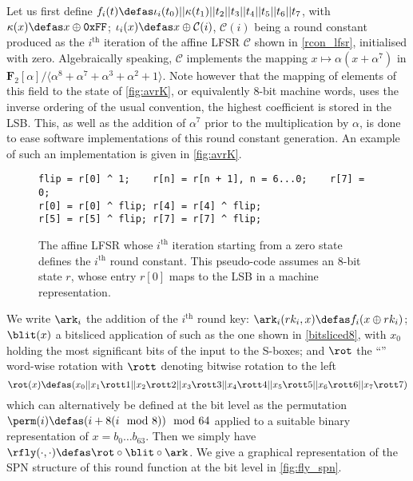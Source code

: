 Let us first define $f_i(t) \defas \iota_i(t_0)||\kappa(t_1)||t_2||t_3||t_4||t_5||t_6||t_7$, with $\kappa(x) \defas x \oplus \texttt{0xFF}$;
$\iota_i(x) \defas x \oplus \mathcal{C}(i)$,
$\mathcal{C}(i)$ being a round constant produced as the $i^\text{th}$ iteration of the affine LFSR $\mathcal{C}$ shown in
\autoref{rcon_lfsr}, initialised with zero. Algebraically speaking, $\mathcal{C}$ implements the mapping $x \mapsto \alpha(x + \alpha^7)$
in $\mathbf{F}_2[\alpha]/\langle \alpha^8+\alpha^7+\alpha^3+\alpha^2+1\rangle$. Note however that the mapping of elements of this field to the state of
\autoref{fig:avrK}, or equivalently 8-bit machine words, uses the inverse ordering of the usual convention, \ie{} the highest coefficient is
stored in the LSB. This, as well as the addition of $\alpha^7$ prior to the multiplication by $\alpha$, is done to ease software implementations
of this round constant generation. An example of such an implementation is given in
\autoref{fig:avrK}.
\begin{figure}[ht]
\begin{verbatim}
flip = r[0] ^ 1;    r[n] = r[n + 1], n = 6...0;    r[7] = 0;
r[0] = r[0] ^ flip; r[4] = r[4] ^ flip;
r[5] = r[5] ^ flip; r[7] = r[7] ^ flip;
\end{verbatim}
\caption[The round-constant-generating affine LFSR.]{The affine LFSR whose $i^\text{th}$ iteration starting from a zero state defines the $i^\text{th}$ round constant. This pseudo-code
assumes an 8-bit state $r$, whose entry $r[0]$ maps to the LSB in a machine representation\label{rcon_lfsr}.}
\end{figure}

We write $\ark_i$ the addition of the $i^\text{th}$ round key: $\ark_i(rk_i, x) \defas f_i(x \oplus rk_i)$;
$\blit(x)$ a bitsliced application of
\littlunOne such as \eg the one shown in \autoref{bitsliced8}, with $x_0$ holding the most significant bits of the input to the S-boxes;
and $\rot$ the ``\shiftrow'' word-wise rotation with $\rott$ denoting bitwise rotation to the left
\[
\rot(x) \defas (x_0||x_1 \rott 1||x_2 \rott 2||x_3 \rott 3||x_4 \rott 4||x_5 \rott 5||x_6 \rott 6||x_7 \rott 7)
\]
which can alternatively be defined at the bit level as the permutation $\perm(i) \defas (i + 8(i \mod 8)) \mod 64$
applied to a suitable binary representation of $x = b_0\ldots b_{63}$. Then we simply have
$\rfly(\cdot,\cdot) \defas \rot \circ \blit \circ \ark$.
We give a graphical representation of the SPN structure of this round function at the bit level in \autoref{fig:fly_spn}.

